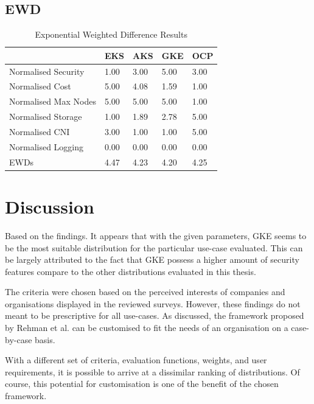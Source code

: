 \section{EWD}

\begin{table}[!ht]
    \centering
    \begin{tabular}{|p{4cm}|p{2cm}|p{2cm}|p{2cm}|p{2cm}|} %
    \hline
         & EKS& AKS& GKE& OCP\\ \hline
        Normalised Security& 1.00& 3.00& 5.00& 3.00\\ \hline
        Normalised Cost& 5.00& 4.08& 1.59& 1.00\\ \hline
        Normalised Max Nodes& 5.00& 5.00& 5.00& 1.00\\ \hline
        Normalised Storage& 1.00& 1.89& 2.78& 5.00\\ \hline
        Normalised CNI& 3.00& 1.00& 1.00& 5.00\\ \hline
 Normalised Logging& 0.00& 0.00& 0.00&0.00\\\hline
 EWDs& 4.47& 4.23& 4.20&4.25\\\hline
    \end{tabular}
    \caption{Exponential Weighted Difference Results} 
    \label{tab:cost-analysis}
\end{table}

\chapter{Discussion}

Based on the findings. It appears that with the given parameters, GKE seems to be the most suitable distribution for the particular use-case evaluated. This can be largely attributed to the fact that GKE possess a higher amount of security features compare to the other distributions evaluated in this thesis.

The criteria were chosen based on the perceived interests of companies and organisations displayed in the reviewed surveys. However, these findings do not meant to be prescriptive for all use-cases. As discussed, the framework proposed by Rehman et al. \cite{5976164} can be customised to fit the needs of an organisation on a case-by-case basis.

With a different set of criteria, evaluation functions, weights, and user requirements, it is possible to arrive at a dissimilar ranking of distributions. Of course, this potential for customisation is one of the benefit of the chosen framework.

